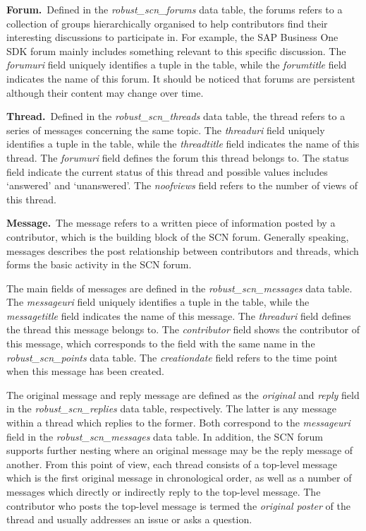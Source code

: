 \textbf{Forum.}~Defined in the \emph{robust\_scn\_forums} data table, the forums refers to a collection of groups hierarchically organised to help contributors find their interesting discussions to participate in. For example, the SAP Business One SDK forum mainly includes something relevant to this specific discussion. The \emph{forumuri} field uniquely identifies a tuple in the table, while the \emph{forumtitle} field indicates the name of this forum. It should be noticed that forums are persistent although their content may change over time.

\textbf{Thread.}~Defined in the \emph{robust\_scn\_threads} data table, the thread refers to a series of messages concerning the same topic. The \emph{threaduri} field uniquely identifies a tuple in the table, while the \emph{threadtitle} field indicates the name of this thread. The \emph{forumuri} field defines the forum this thread belongs to. The status field indicate the current status of this thread and possible values includes `answered' and `unanswered'. The \emph{noofviews} field refers to the number of views of this thread.

\textbf{Message.}~The message refers to a written piece of information posted by a contributor, which is the building block of the SCN forum. Generally speaking, messages describes the post relationship between contributors and threads, which forms the basic activity in the SCN forum.

The main fields of messages are defined in the \emph{robust\_scn\_messages} data table. The \emph{messageuri} field uniquely identifies a tuple in the table, while the \emph{messagetitle} field indicates the name of this message. The \emph{threaduri} field defines the thread this message belongs to. The \emph{contributor} field shows the contributor of this message, which corresponds to the field with the same name in the \emph{robust\_scn\_points} data table. The \emph{creationdate} field refers to the time point when this message has been created.

The original message and reply message are defined as the \emph{original} and \emph{reply} field in the \emph{robust\_scn\_replies} data table, respectively. The latter is any message within a thread which replies to the former. Both correspond to the \emph{messageuri} field in the \emph{robust\_scn\_messages} data table. In addition, the SCN forum supports further nesting where an original message may be the reply message of another. From this point of view, each thread consists of a top-level message which is the first original message in chronological order, as well as a number of messages which directly or indirectly reply to the top-level message. The contributor who posts the top-level message is termed the \emph{original poster} of the thread and usually addresses an issue or asks a question.

